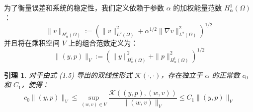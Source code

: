 \documentclass[UTF8, 12pt]{ctexart}
\newtheorem{lemma}{引理}[section]
\begin{document}
为了衡量误差和系统的稳定性，我们定义依赖于参数 $\alpha$ 的加权能量范数 $H_\alpha^1(\Omega)$：
\begin{equation}
\|v\|_{H_\alpha^1(\Omega)} := \left( \|v\|_{L^2(\Omega)}^2 + \alpha^{1/2}\|\nabla v\|_{L^2(\Omega)}^2 \right)^{1/2}
\end{equation}
并且将在乘积空间 $V$ 上的组合范数定义为：
\begin{equation}
\|(y,p)\|_V := \left( \|y\|_{H_\alpha^1(\Omega)}^2 + \|p\|_{H_\alpha^1(\Omega)}^2 \right)^{1/2}
\end{equation}


\begin{lemma}
对于由式 (1.5) 导出的双线性形式 $\mathcal{K}(\cdot, \cdot)$，存在独立于 $\alpha$ 的正常数 $c_0$ 和 $C_1$，使得：
\begin{equation}
c_0 \|(y,p)\|_V \le \sup_{(w,v)\in V} \frac{\mathcal{K}((y,p),(w,v))}{\|(w,v)\|_V} \le C_1 \|(y,p)\|_V
\end{equation}
\end{lemma}
\end{document}
